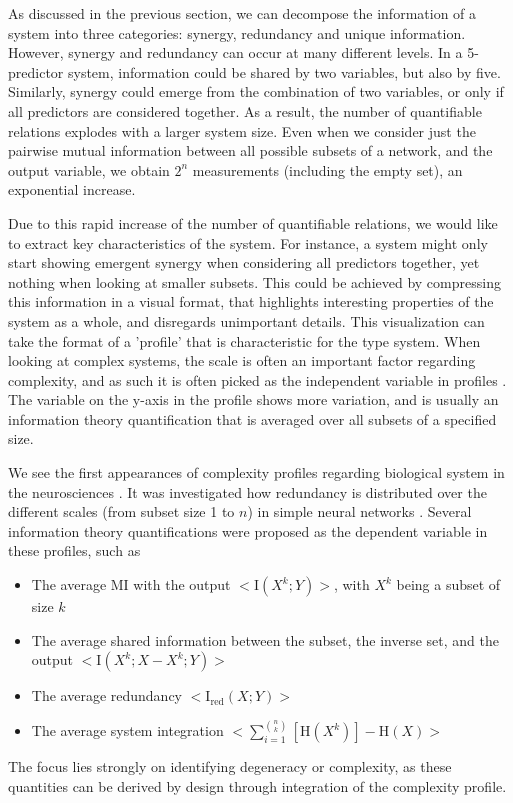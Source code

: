 \documentclass[../main.tex]{subfiles}
\begin{document}
As discussed in the previous section, we can decompose the information of a system into three categories: synergy, redundancy and unique information.
However, synergy and redundancy can occur at many different levels.
In a 5-predictor system, information could be shared by two variables, but also by five.
Similarly, synergy could emerge from the combination of two variables, or only if all predictors are considered together.
As a result, the number of quantifiable relations explodes with a larger system size.
Even when we consider just the pairwise mutual information between all possible subsets of a network, and the output variable, we obtain $2^n$ measurements (including the empty set), an exponential increase.

Due to this rapid increase of the number of quantifiable relations, we would like to extract key characteristics of the system.
For instance, a system might only start showing emergent synergy when considering all predictors together, yet nothing when looking at smaller subsets.
This could be achieved by compressing this information in a visual format, that highlights interesting properties of the system as a whole, and disregards unimportant details.
This visualization can take the format of a 'profile' that is characteristic for the type system.
When looking at complex systems, the scale is often an important factor regarding complexity, and as such it is often picked as the independent variable in profiles \cite{bar2013computationally, quax2017quantifying, tononi1999measures}.
The variable on the y-axis in the profile shows more variation, and is usually an information theory quantification that is averaged over all subsets of a specified size.

We see the first appearances of complexity profiles regarding biological system in the neurosciences \cite{}.
It was investigated how redundancy is distributed over the different scales (from subset size 1 to $n$) in simple neural networks \cite{tononi1999measures}. 
Several information theory quantifications were proposed as the dependent variable in these profiles, such as
%
\begin{itemize}
\item The average MI with the output $<\mathrm{I}(X^k;Y)>$, with $X^k$ being a subset of size $k$
\item The average shared information between the subset, the inverse set, and the output  $<\mathrm{I}(X^k;X - X^k;Y)>$
\item The average redundancy $<\mathrm{I}_\mathrm{red}(X;Y)>$
\item The average system integration $<\sum_{i = 1}^{\binom{n}{k}}[\mathrm{H}(X^k)] - \mathrm{H}(X)>$
\end{itemize}
%
The focus lies strongly on identifying degeneracy or complexity, as these quantities can be derived by design through integration of the complexity profile.
\end{document}
